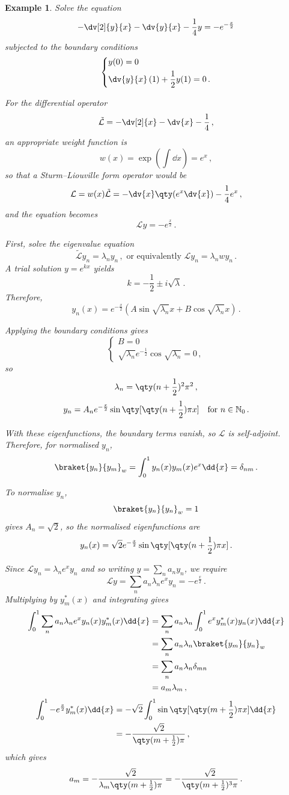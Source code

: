 \documentclass{article}
\theoremstyle{plain}\theoremheaderfont{\normalfont\itshape}\theorembodyfont{\rmfamily}\theoremseparator{.}\newtheorem*{rem}{Remark}\newtheorem*{ex}{Example}\newtheorem*{proof}{Proof}\newtheorem*{altp}{Alternative proof}
\theoremstyle{plain}\theoremheaderfont{\normalfont\bfseries}\theorembodyfont{\rmfamily}\theoremseparator{.}\newtheorem{thm}{Theorem}[section]\newtheorem{lem}[thm]{Lemma}\newtheorem{prop}[thm]{Proposition}\newtheorem*{cor}{Corollary}\newtheorem{defn}[thm]{Definition}\newtheorem{clm}[thm]{Claim}\newtheorem{clminproof}{Claim}
\theoremstyle{break}\theoremheaderfont{\normalfont\itshape}\theorembodyfont{\rmfamily}\theoremseparator{.\medskip}\newtheorem*{proofskip}{Proof}\newtheorem*{exs}{Examples}\newtheorem*{rems}{Remarks}
\theoremstyle{break}\theoremheaderfont{\normalfont\bfseries}\theorembodyfont{\rmfamily}\theoremseparator{.\medskip}\newtheorem{lemskip}[thm]{Lemma}\newtheorem{defnskip}[thm]{Definition}\newtheorem{propskip}[thm]{Proposition}\newtheorem{thmskip}[thm]{Theorem}
\numberwithin{equation}{section}
\begin{document}
	\begin{ex}
		Solve the equation
		\[-\dv[2]{y}{x}-\dv{y}{x}-\frac{1}{4}y=-e^{-\frac{x}{2}}\]
		subjected to the boundary conditions
		\[\left\{\begin{aligned}
			&y(0)=0\\
			&\dv{y}{x}\,(1)+\frac{1}{2}y(1)=0\,.
		\end{aligned}\right.\]

		For the differential operator
		\[\mathcal{\tilde{L}}=-\dv[2]{x}-\dv{x}-\frac{1}{4}\,,\]
		an appropriate weight function is
		\[w(x)=\exp(\int\dd{x})=e^x\,,\]
		so that a Sturm--Liouville form operator would be
		\[\mathcal{L}=w(x)\mathcal{\tilde{L}}=-\dv{x}\qty(e^x\dv{x})-\frac{1}{4}e^x\,,\]
		and the equation becomes
		\[\mathcal{L}y=-e^{\frac{x}{2}}\,.\]

		First, solve the eigenvalue equation
		\[\mathcal{\tilde{L}}y_n=\lambda_ny_n\,,\text{ or equivalently }\mathcal{L}y_n=\lambda_n wy_n\,.\]
		A trial solution \(y=e^{kx}\) yields
		\[k=-\frac{1}{2}\pm i\sqrt{\lambda}\,.\]
		Therefore,
		\[y_n(x)=e^{-\frac{x}{2}}(A\sin\sqrt{\lambda_n}x+B\cos\sqrt{\lambda_n}x)\,.\]

		Applying the boundary conditions gives
		\[\begin{cases}
			B=0\\
			\sqrt{\lambda_n}e^{-\frac{1}{2}}\cos\sqrt{\lambda_n}=0\,,
		\end{cases}\]
		so
		\[\lambda_n=\qty(n+\frac{1}{2})^2\pi^2\,,\]
		\[y_n=A_ne^{-\frac{x}{2}}\sin\qty[\qty(n+\frac{1}{2})\pi x]\quad \text{for }n\in\mathbb{N}_0\,.\]
		
		With these eigenfunctions, the boundary terms vanish, so \(\mathcal{L}\) is self-adjoint. Therefore, for normalised \(y_n\),
		\[\braket{y_n}{y_m}_w=\int_{0}^{1}y_n(x)y_m(x)e^x\dd{x}=\delta_{nm}\,.\]

		To normalise \(y_n\),
		\[\braket{y_n}{y_n}_w=1\]
		gives \(A_n=\sqrt{2}\), so the normalised eigenfunctions are
		\[y_n(x)=\sqrt{2}e^{-\frac{x}{2}}\sin\qty[\qty(n+\frac{1}{2})\pi x]\,.\]

		Since \(\mathcal{L}y_n=\lambda_ne^xy_n\) and so writing \(y=\sum_n a_ny_n\), we require
		\[\mathcal{L}y=\sum_n a_n\lambda_n e^x y_n=-e^{\frac{x}{2}}\,.\]
		Multiplying by \(y_m^*(x)\) and integrating gives
		\begin{align*}
			\int_{0}^{1}\sum_n a_n\lambda_ne^xy_n(x)y_m^*(x)\dd{x}&=\sum_n a_n\lambda_n\int_{0}^{1}e^xy_m^*(x)y_n(x)\dd{x}\\
			&=\sum_n a_n\lambda_n \braket{y_m}{y_n}_w\\
			&=\sum_{n} a_n \lambda_n\delta_{mn}\\
			&=a_m\lambda_m\,,
		\end{align*}
		\begin{align*}
			\int_{0}^{1}-e^{\frac{x}{2}}y_m^*(x)\dd{x}&=-\sqrt{2}\int_{0}^{1}\sin\qty[\qty(m+\frac{1}{2})\pi x]\dd{x}\\
			&=-\frac{\sqrt{2}}{\qty(m+\frac{1}{2})\pi}\,,
		\end{align*}
		which gives
		\[a_m=-\frac{\sqrt{2}}{\lambda_m\qty(m+\frac{1}{2})\pi}=-\frac{\sqrt{2}}{\qty(m+\frac{1}{2})^3\pi}\,.\]


\end{ex}
\end{document}
